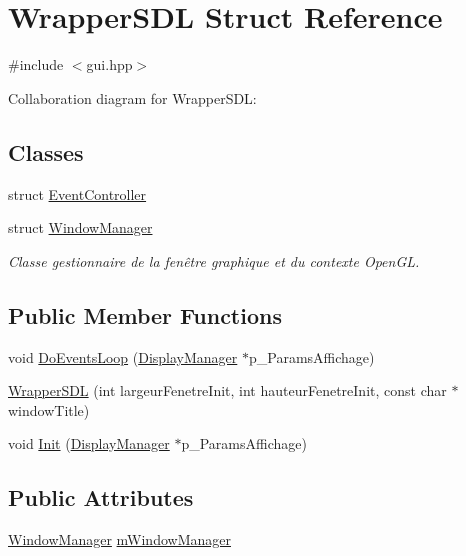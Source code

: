 \hypertarget{struct_wrapper_s_d_l}{}\section{Wrapper\+S\+DL Struct Reference}
\label{struct_wrapper_s_d_l}


{\ttfamily \#include $<$gui.\+hpp$>$}



Collaboration diagram for Wrapper\+S\+DL\+:
\subsection*{Classes}
\begin{DoxyCompactItemize}
\item 
struct \hyperlink{struct_wrapper_s_d_l_1_1_event_controller}{Event\+Controller}
\item 
struct \hyperlink{struct_wrapper_s_d_l_1_1_window_manager}{Window\+Manager}
\begin{DoxyCompactList}\small\item\em Classe gestionnaire de la fenêtre graphique et du contexte Open\+GL. \end{DoxyCompactList}\end{DoxyCompactItemize}
\subsection*{Public Member Functions}
\begin{DoxyCompactItemize}
\item 
void \hyperlink{struct_wrapper_s_d_l_a22e3212f89893ca93010a76df861726b}{Do\+Events\+Loop} (\hyperlink{class_display_manager}{Display\+Manager} $\ast$p\+\_\+\+Params\+Affichage)
\item 
\hyperlink{struct_wrapper_s_d_l_ae0484ea23c2afaae3cdc6ec0a425bdeb}{Wrapper\+S\+DL} (int largeur\+Fenetre\+Init, int hauteur\+Fenetre\+Init, const char $\ast$window\+Title)
\item 
void \hyperlink{struct_wrapper_s_d_l_a6731fd378a5431029257edae59bbb6d1}{Init} (\hyperlink{class_display_manager}{Display\+Manager} $\ast$p\+\_\+\+Params\+Affichage)
\end{DoxyCompactItemize}
\subsection*{Public Attributes}
\begin{DoxyCompactItemize}
\item 
\hyperlink{struct_wrapper_s_d_l_1_1_window_manager}{Window\+Manager} \hyperlink{struct_wrapper_s_d_l_a5a50735f512fac9cdae12eb6602589cb}{m\+Window\+Manager}
\end{DoxyCompactItemize}


